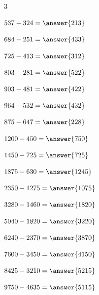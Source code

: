 \documentclass{ximera}
\begin{document}
\begin{oefening}{\oefB\ESS}
\begin{multicols}{3}
\begin{question} \(537-324=\answer{213}\) \end{question}

\begin{question} \(684-251=\answer{433}\) \end{question}

\begin{question} \(725-413=\answer{312}\) \end{question}

\begin{question} \(803-281=\answer{522}\) \end{question}

\begin{question} \(903-481=\answer{422}\) \end{question}

\begin{question} \(964-532=\answer{432}\) \end{question}

\begin{question} \(875-647=\answer{228}\) \end{question}

\begin{question} \(1200-450=\answer{750}\) \end{question}

\begin{question} \(1450-725=\answer{725}\) \end{question}

\begin{question} \(1875-630=\answer{1245}\) \end{question}

\begin{question} \(2350-1275=\answer{1075}\) \end{question}

\begin{question} \(3280-1460=\answer{1820}\) \end{question}

\begin{question} \(5040-1820=\answer{3220}\) \end{question}

\begin{question} \(6240-2370=\answer{3870}\) \end{question}

\begin{question} \(7600-3450=\answer{4150}\) \end{question}

\begin{question} \(8425-3210=\answer{5215}\) \end{question}

\begin{question} \(9750-4635=\answer{5115}\) \end{question}

\end{multicols}

\end{oefening}
\end{document}
